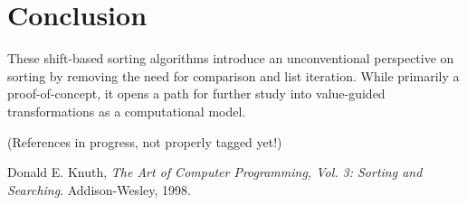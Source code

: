 \documentclass[12pt]{article}
\begin{document}
\section{Conclusion}
These shift-based sorting algorithms introduce an unconventional perspective on sorting by removing the need for comparison and list iteration. While primarily a proof-of-concept, it opens a path for further study into value-guided transformations as a computational model.

(References in progress, not properly tagged yet!)

\begin{thebibliography}{1}

Donald E. Knuth,
\textit{The Art of Computer Programming, Vol. 3: Sorting and Searching}.
Addison-Wesley, 1998.

\end{thebibliography}
\end{document}
